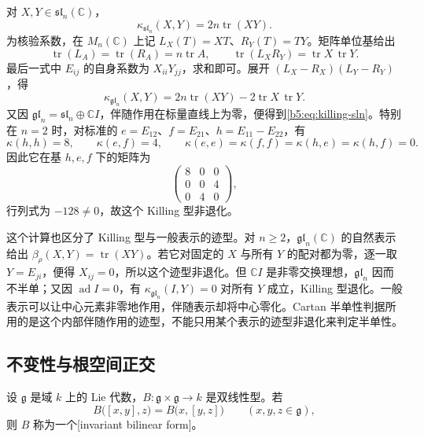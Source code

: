 \begin{example}\label{b5:exm:killing-sln}
	对 \(X,Y\in\mathfrak{sl}_n(\mathbb C)\)，
	\begin{equation}\label{b5:eq:killing-sln}
		\kappa_{\mathfrak{sl}_n}(X,Y)=2n\operatorname{tr}(XY).
	\end{equation}
	为核验系数，在 \(M_n(\mathbb C)\) 上记 \(L_X(T)=XT\)、\(R_Y(T)=TY\)。矩阵单位基给出
	\[
		\operatorname{tr}(L_A)=\operatorname{tr}(R_A)=n\operatorname{tr}A, \qquad \operatorname{tr}(L_XR_Y)=\operatorname{tr}X\,\operatorname{tr}Y.
	\]
	最后一式中 \(E_{ij}\) 的自身系数为 \(X_{ii}Y_{jj}\)，求和即可。展开 \((L_X-R_X)(L_Y-R_Y)\)，得
	\[
		\kappa_{\mathfrak{gl}_n}(X,Y) =2n\operatorname{tr}(XY)-2\operatorname{tr}X\,\operatorname{tr}Y.
	\]
	又因 \(\mathfrak{gl}_n=\mathfrak{sl}_n\oplus\mathbb CI\)，伴随作用在标量直线上为零，便得到\eqref{b5:eq:killing-sln}。特别在 \(n=2\) 时，对标准的 \(e=E_{12}\)、\(f=E_{21}\)、\(h=E_{11}-E_{22}\)，有
	\[
		\kappa(h,h)=8,\qquad \kappa(e,f)=4,\qquad \kappa(e,e)=\kappa(f,f)=\kappa(h,e)=\kappa(h,f)=0.
	\]
	因此它在基 \(h,e,f\) 下的矩阵为
	\[
		\begin{pmatrix}8&0&0\\0&0&4\\0&4&0\end{pmatrix},
	\]
	行列式为 \(-128\ne0\)，故这个 Killing 型非退化。
\end{example}

这个计算也区分了 Killing 型与一般表示的迹型。对 \(n\ge2\)，\(\mathfrak{gl}_n(\mathbb C)\) 的自然表示给出 \(\beta_\rho(X,Y)=\operatorname{tr}(XY)\)。若它对固定的 \(X\) 与所有 \(Y\) 的配对都为零，逐一取 \(Y=E_{ji}\)，便得 \(X_{ij}=0\)，所以这个迹型非退化。但 \(\mathbb CI\) 是非零交换理想，\(\mathfrak{gl}_n\) 因而不半单；又因 \(\operatorname{ad}I=0\)，有 \(\kappa_{\mathfrak{gl}_n}(I,Y)=0\) 对所有 \(Y\) 成立，Killing 型退化。一般表示可以让中心元素非零地作用，伴随表示却将中心零化。Cartan 半单性判据所用的是这个内部伴随作用的迹型，不能只用某个表示的迹型非退化来判定半单性。

\subsection{不变性与根空间正交}
\label{b5:subsec:1301:02}

\begin{definition}\label{b5:def:invariant-bilinear-lie}
	设 \(\mathfrak g\) 是域 \(k\) 上的 Lie 代数，\(B:\mathfrak g\times\mathfrak g\rightarrow k\) 是双线性型。若
	\[
		B\bigl([x,y],z\bigr)=B\bigl(x,[y,z]\bigr)\qquad(x,y,z\in\mathfrak g),
	\]
	则 \(B\) 称为一个[invariant bilinear form]。
\end{definition}

